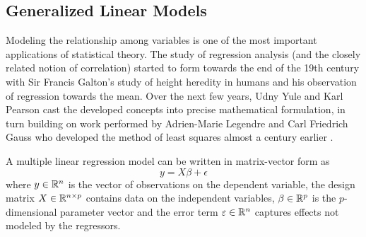 \subsection{Generalized Linear Models}
Modeling the relationship among variables is one of the most important applications of statistical theory. The study of regression analysis (and the closely related notion of correlation) started to form towards the end of the 19th century with Sir Francis Galton's study of height heredity in humans and his observation of regression towards the mean. Over the next few years, Udny Yule and Karl Pearson cast the developed concepts into precise mathematical formulation, in turn building on work performed by Adrien-Marie Legendre and Carl Friedrich Gauss who developed the method of least squares almost a century earlier \citep{Allen1997}.

A multiple linear regression model can be written in matrix-vector form as
\begin{equation}
  y = X \beta + \epsilon \label{eq:lin-reg}
\end{equation}
where $y \in \mathbb{R}^n$ is the vector of observations on the dependent variable, the design matrix $X \in \mathbb{R}^{n \times p}$ contains data on the independent variables, $\beta \in \mathbb{R}^p$ is the $p$-dimensional parameter vector and the error term $\varepsilon \in \mathbb{R}^n$ captures effects not modeled by the regressors.

